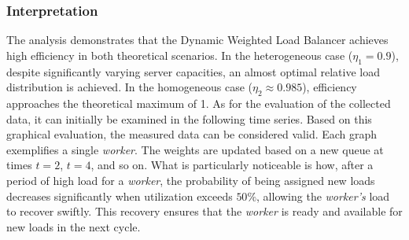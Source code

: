 \documentclass[twocolumn]{webofc}
\begin{document}
\subsubsection{Interpretation}
The analysis demonstrates that the Dynamic Weighted Load Balancer achieves high efficiency in both theoretical scenarios. In the heterogeneous case (\(\eta_1 = 0.9\)), despite significantly varying server capacities, an almost optimal relative load distribution is achieved. In the homogeneous case (\(\eta_2 \approx 0.985\)), efficiency approaches the theoretical maximum of 1. As for the evaluation of the collected data, it can initially be examined in the following time series. Based on this graphical evaluation, the measured data can be considered valid. Each graph exemplifies a single \textit{worker}. The weights are updated based on a new queue at times \(t=2\), \(t=4\), and so on. What is particularly noticeable is how, after a period of high load for a \textit{worker}, the probability of being assigned new loads decreases significantly when utilization exceeds \(50\%\), allowing the \textit{worker's} load to recover swiftly. This recovery ensures that the \textit{worker} is ready and available for new loads in the next cycle.
\begin{figure}[htbp]
\centering
{}
\end{figure}
\end{document}
